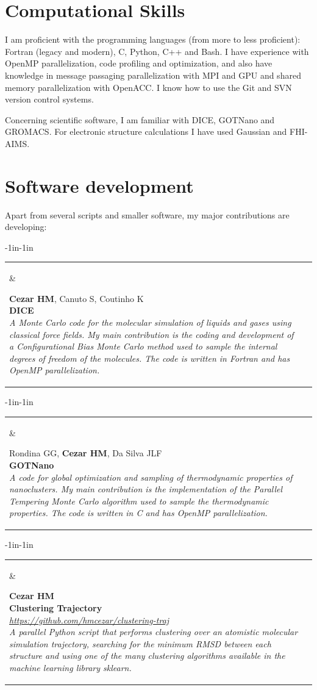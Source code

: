 \documentclass[10pt]{article}
\newcommand{\newsoftware}[3]{
\begin{adjustwidth}{-1in}{-1in}  
\begin{tabular}{p{0.9in}p{7in}}
\parbox[c]{0.9in}{} & \parbox[c]{6in}{\setstretch{0.9} {\scriptsize {#1}} \\ {\bf #2}  \\ {\footnotesize\emph {#3}}}
\end{tabular}
\end{adjustwidth}
\vspace{0.2in}
}
\begin{document}
\section*{Computational Skills}
I am proficient with the programming languages (from more to less proficient): Fortran (legacy and modern), C, Python, C++ and Bash. I have experience with OpenMP parallelization, code profiling and optimization, and also have knowledge in message passaging parallelization with MPI and GPU and shared memory parallelization with OpenACC. I know how to use the Git and SVN version control systems.

Concerning scientific software, I am familiar with DICE, GOTNano and GROMACS. For electronic structure calculations I have used Gaussian and FHI-AIMS.





\section*{Software development}
Apart from several scripts and smaller software, my major contributions are developing:\\

\newsoftware{\textbf{Cezar HM}, Canuto S, Coutinho K}{DICE}{A Monte Carlo code for the molecular simulation of liquids and gases using classical force fields. My main contribution is the coding and development of a Configurational Bias Monte Carlo method used to sample the internal degrees of freedom of the molecules. The code is written in Fortran and has OpenMP parallelization.}

\newsoftware{Rondina GG, \textbf{Cezar HM}, Da Silva JLF}{GOTNano}{A code for global optimization and sampling of thermodynamic properties of nanoclusters. My main contribution is the implementation of the Parallel Tempering Monte Carlo algorithm used to sample the thermodynamic properties. The code is written in C and has OpenMP parallelization.}

\newsoftware{\textbf{Cezar HM}}{Clustering Trajectory}{\href{https://github.com/hmcezar/clustering-traj}{https://github.com/hmcezar/clustering-traj} \\ A parallel Python script that performs clustering over an atomistic molecular simulation trajectory, searching for the minimum RMSD between each structure and using one of the many clustering algorithms available in the machine learning library sklearn.}
\end{document}
